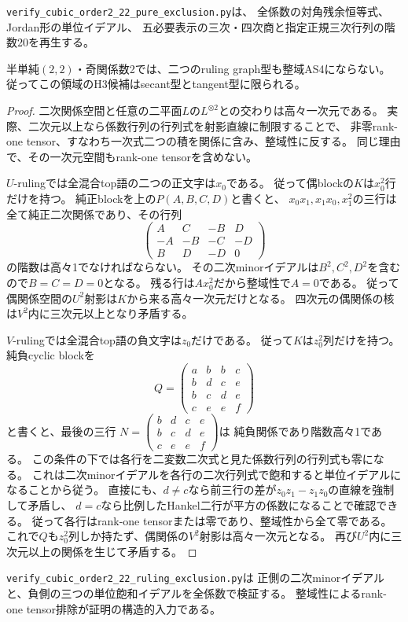 \texttt{verify\_cubic\_order2\_22\_pure\_exclusion.py}は、
全係数の対角残余恒等式、Jordan形の単位イデアル、
五必要表示の三次・四次商と指定正規三次行列の階数20を再生する。

\begin{theorem}\label{thm:h3-order2-22-ruling-exclusion}
半単純$(2,2)$・奇関係数2では、二つのruling graph型も整域AS4にならない。
従ってこの領域のH3候補はsecant型とtangent型に限られる。
\end{theorem}
\begin{proof}
二次関係空間と任意の二平面$L$の$L^{\otimes2}$との交わりは高々一次元である。
実際、二次元以上なら係数行列の行列式を射影直線に制限することで、
非零rank-one tensor、すなわち一次式二つの積を関係に含み、整域性に反する。
同じ理由で、その一次元空間もrank-one tensorを含めない。

$U$-rulingでは全混合top語の二つの正文字は$x_0$である。
従って偶blockの$K$は$x_0^2$行だけを持つ。
純正blockを上の$P(A,B,C,D)$と書くと、
$x_0x_1,x_1x_0,x_1^2$の三行は全て純正二次関係であり、その行列
\[
 \begin{pmatrix}A&C&-B&D\\-A&-B&-C&-D\\B&D&-D&0\end{pmatrix}
\]
の階数は高々1でなければならない。
その二次minorイデアルは$B^2,C^2,D^2$を含むので$B=C=D=0$となる。
残る行は$Ax_0^2$だから整域性で$A=0$である。
従って偶関係空間の$U^2$射影は$K$から来る高々一次元だけとなる。
四次元の偶関係の核は$V^2$内に三次元以上となり矛盾する。

$V$-rulingでは全混合top語の負文字は$z_0$だけである。
従って$K$は$z_0^2$列だけを持つ。
純負cyclic blockを
\[
 Q=\begin{pmatrix}
 a&b&b&c\\b&d&c&e\\b&c&d&e\\c&e&e&f
 \end{pmatrix}
\]
と書くと、最後の三行
$N=\left(\begin{smallmatrix}b&d&c&e\\b&c&d&e\\c&e&e&f\end{smallmatrix}\right)$は
純負関係であり階数高々1である。
この条件の下では各行を二変数二次式と見た係数行列の行列式も零になる。
これは二次minorイデアルを各行の二次行列式で飽和すると単位イデアルになることから従う。
直接にも、$d\ne c$なら前三行の差が$z_0z_1-z_1z_0$の直線を強制して矛盾し、
$d=c$なら比例したHankel二行が平方の係数になることで確認できる。
従って各行はrank-one tensorまたは零であり、整域性から全て零である。
これで$Q$も$z_0^2$列しか持たず、偶関係の$V^2$射影は高々一次元となる。
再び$U^2$内に三次元以上の関係を生じて矛盾する。
\end{proof}

\texttt{verify\_cubic\_order2\_22\_ruling\_exclusion.py}は
正側の二次minorイデアルと、負側の三つの単位飽和イデアルを全係数で検証する。
整域性によるrank-one tensor排除が証明の構造的入力である。
